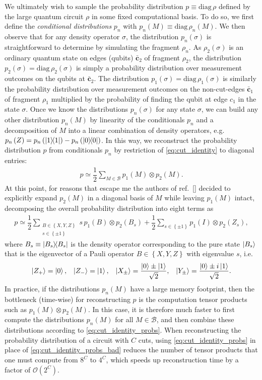 \documentclass[nofootinbib,notitlepage,11pt]{revtex4-2}
\newcommand{\f}[2]{\dfrac{#1}{#2}} %
\newcommand{\p}[1]{\left(#1\right)} %
\renewcommand{\set}[1]{\left\{#1\right\}} %
\renewcommand{\v}{\bm} %
\newcommand{\B}{\mathcal{B}}
\renewcommand{\O}{\mathcal{O}}
\newcommand{\diag}{\mathrm{diag}\,}
\begin{document}
We ultimately wish to sample the probability distribution
$p\equiv\diag\rho$ defined by the large quantum circuit $\rho$ in some
fixed computational basis. To do so, we first define the {\it
  conditional distributions} $p_n$ with
$p_n\p{M}\equiv\diag\rho_n\p{M}$.  We then observe that for any
density operator $\sigma$, the distribution $p_n\p{\sigma}$ is
straightforward to determine by simulating the fragment $\rho_n$.  As
$\rho_2\p{\sigma}$ is an ordinary quantum state on edges (qubits)
$\bar{\v c}_2$ of fragment $\rho_2$, the distribution
$p_2\p{\sigma}=\diag\rho_2\p{\sigma}$ is simply a probability
distribution over measurement outcomes on the qubits at
$\bar{\v c}_2$.  The distribution
$p_1\p{\sigma}=\diag\rho_1\p{\sigma}$ is similarly the probability
distribution over measurement outcomes on the non-cut-edges
$\bar{\v c}_1$ of fragment $\rho_1$ multiplied by the probability of
finding the qubit at edge $c_1$ in the state $\sigma$.  Once we know
the distributions $p_n\p{\sigma}$ for any state $\sigma$, we can build
any other distribution $p_n\p{M}$ by linearity of the conditionals
$p_n$ and a decomposition of $M$ into a linear combination of density
operators, e.g.~$p_n\p{Z}=p_n\p{\op{1}}-p_n\p{\op{0}}$.  In this way,
we reconstruct the probability distribution $p$ from conditionals
$p_n$ by restriction of \eqref{eq:cut_identity} to diagonal entries:
\begin{align}
  p \simeq \f12 \sum_{M\in\B} p_1\p{M} \otimes p_2\p{M}.
  \label{eq:cut_identity_probs}
\end{align}
At this point, for reasons that escape me the authors of
ref.~[] decided to explicitly expand
$p_2\p{M}$ in a diagonal basis of $M$ while leaving $p_1\p{M}$ intact,
decomposing the overall probability distribution into eight terms as
\begin{align}
  p \simeq \f12 \sum_{\substack{B\in\set{X,Y,Z}\\s\in\set{\pm1}}}
  s\, p_1\p{B} \otimes p_2\p{B_s}
  + \f12\sum_{s\in\set{\pm1}} p_1\p{I} \otimes p_2\p{Z_s},
  \label{eq:cut_identity_probs_bad}
\end{align}
where $B_s\equiv\op{B_s}$ is the density operator corresponding to the
pure state $\ket{B_s}$ that is the eigenvector of a Pauli operator
$B\in\set{X,Y,Z}$ with eigenvalue $s$, i.e.
\begin{align}
  \ket{Z_+} = \ket0, && \ket{Z_-} = \ket1, &&
  \ket{X_\pm} = \f{\ket0 \pm \ket1}{\sqrt2}, &&
  \ket{Y_\pm} = \f{\ket0 \pm i\ket1}{\sqrt2}.
\end{align}
In practice, if the distributions $p_n\p{M}$ have a large memory
footprint, then the bottleneck (time-wise) for reconstructing $p$ is
the computation tensor products such as $p_1\p{M} \otimes p_2\p{M}$.
In this case, it is therefore much faster to first compute the
distributions $p_n\p{M}$ for all $M\in\B$, and then combine these
distributions according to \eqref{eq:cut_identity_probs}.  When
reconstructing the probability distribution of a circuit with $C$
cuts, using \eqref{eq:cut_identity_probs} in place of
\eqref{eq:cut_identity_probs_bad} reduces the number of tensor
products that one must compute from $8^C$ to $4^C$, which speeds up
reconstruction time by a factor of $\O\p{2^C}$.
\end{document}
